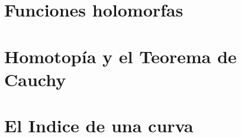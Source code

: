 \documentclass[]{book}
\begin{document}
\hypertarget{funciones-holomorfas}{%
\chapter{Funciones holomorfas}\label{funciones-holomorfas}}

\hypertarget{homotopuxeda-y-el-teorema-de-cauchy}{%
\chapter{Homotopía y el Teorema de Cauchy}\label{homotopuxeda-y-el-teorema-de-cauchy}}

\hypertarget{el-indice-de-una-curva}{%
\chapter{El Indice de una curva}\label{el-indice-de-una-curva}}


\end{document}

